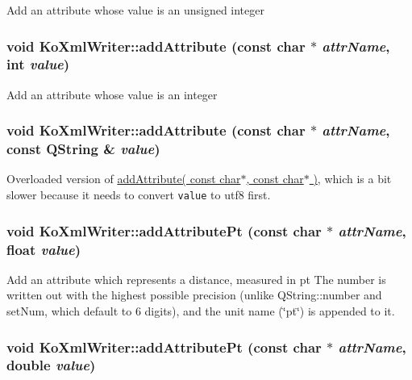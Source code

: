 Add an attribute whose value is an unsigned integer \hypertarget{classKoXmlWriter_fa11b5f1fed349624106280436ca7fb5}{
\subsubsection[{addAttribute}]{\setlength{\rightskip}{0pt plus 5cm}void KoXmlWriter::addAttribute (const char $\ast$ {\em attrName}, \/  int {\em value})}}
\label{classKoXmlWriter_fa11b5f1fed349624106280436ca7fb5}


Add an attribute whose value is an integer \hypertarget{classKoXmlWriter_dbe177678ee94042b4fd352245e625c6}{
\subsubsection[{addAttribute}]{\setlength{\rightskip}{0pt plus 5cm}void KoXmlWriter::addAttribute (const char $\ast$ {\em attrName}, \/  const QString \& {\em value})}}
\label{classKoXmlWriter_dbe177678ee94042b4fd352245e625c6}


Overloaded version of \hyperlink{classKoXmlWriter_920571457da436ac3c6e7f8f0521e48c}{addAttribute( const char$\ast$, const char$\ast$ )}, which is a bit slower because it needs to convert {\tt value} to utf8 first. \hypertarget{classKoXmlWriter_09a850bdbc2da6652e370508d03c6395}{
\subsubsection[{addAttributePt}]{\setlength{\rightskip}{0pt plus 5cm}void KoXmlWriter::addAttributePt (const char $\ast$ {\em attrName}, \/  float {\em value})}}
\label{classKoXmlWriter_09a850bdbc2da6652e370508d03c6395}


Add an attribute which represents a distance, measured in pt The number is written out with the highest possible precision (unlike QString::number and setNum, which default to 6 digits), and the unit name (\char`\"{}pt\char`\"{}) is appended to it. \hypertarget{classKoXmlWriter_59281d5370c489c60515726e0b38ccd0}{
\subsubsection[{addAttributePt}]{\setlength{\rightskip}{0pt plus 5cm}void KoXmlWriter::addAttributePt (const char $\ast$ {\em attrName}, \/  double {\em value})}}
\label{classKoXmlWriter_59281d5370c489c60515726e0b38ccd0}


